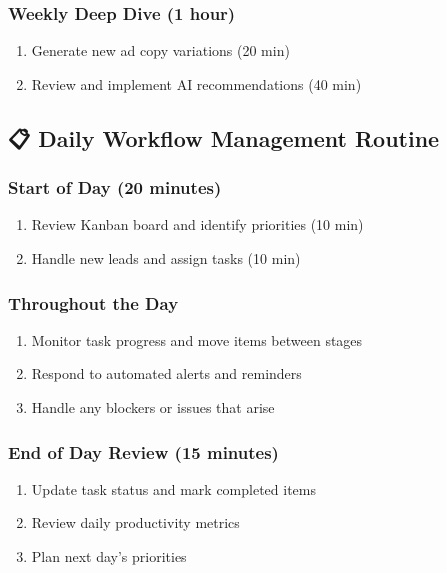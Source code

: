 \documentclass[12pt,a4paper]{article}
\begin{document}
\subsubsection{Weekly Deep Dive (1 hour)}
\begin{enumerate}
    \item Generate new ad copy variations (20 min)
    \item Review and implement AI recommendations (40 min)
\end{enumerate}

\subsection{📋 Daily Workflow Management Routine}

\subsubsection{Start of Day (20 minutes)}
\begin{enumerate}
    \item Review Kanban board and identify priorities (10 min)
    \item Handle new leads and assign tasks (10 min)
\end{enumerate}

\subsubsection{Throughout the Day}
\begin{enumerate}
    \item Monitor task progress and move items between stages
    \item Respond to automated alerts and reminders
    \item Handle any blockers or issues that arise
\end{enumerate}

\subsubsection{End of Day Review (15 minutes)}
\begin{enumerate}
    \item Update task status and mark completed items
    \item Review daily productivity metrics
    \item Plan next day's priorities
\end{enumerate}
\end{document}
